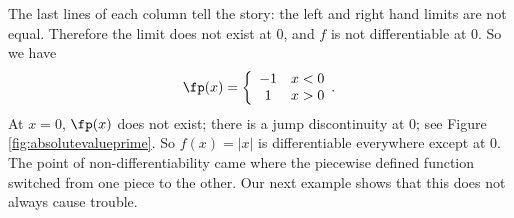 {%
The last lines of each column tell the story: the left and right hand limits are not equal. Therefore the limit does not exist at 0, and $f$ is not differentiable at 0.
So we have 
\[
\fp(x) = \left\{\begin{array}{cc} -1 & x<0 \\ 1 & x>0\end{array}.\right.
\] 
At $x=0$, $\fp(x)$ does not exist; there is a jump discontinuity at 0; see Figure \ref{fig:absolutevalueprime}. So $f(x) = |x|$ is differentiable everywhere except at 0. 
}\\

The point of non-differentiability came where the piecewise defined function switched from one piece to the other. Our next example shows that this does not always cause trouble.\\

